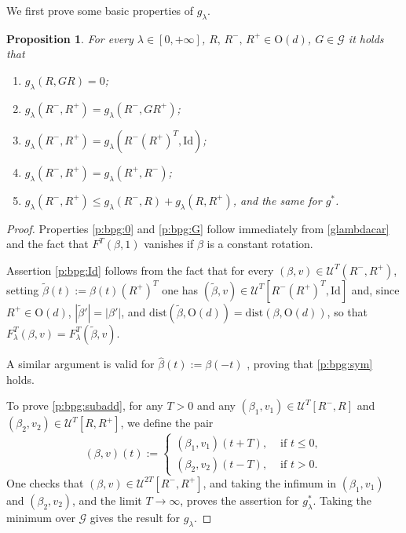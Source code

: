 \documentclass[a4paper,reqno]{amsart}
\newcommand\calU{\mathcal{U}}
\newcommand\dist{{\mathrm{dist}}}
\newcommand\Id{{\mathrm{Id}}}
\newtheorem{proposition}[definition]{Proposition}
\theoremstyle{remark}
\newcommand{\G}{\mathcal{G}}
\newcommand{\On}{\mathrm{O}(d)}
\numberwithin{equation}{section}
\begin{document}
We first prove some basic properties of $g_\lambda$. 
\begin{proposition}\label{p:bpg}
For every $\lambda\in [0,+\infty]$,  $R,\,  R^-,\, R^+ \in \On$, $G\in \G$ it holds that 
\begin{enumerate}
	\item\label{p:bpg:0} $g_\lambda(R, GR)=0$;
	\item\label{p:bpg:G} $g_\lambda( R^-, R^+)=g_\lambda( R^-, GR^+)$;
	\item\label{p:bpg:Id} $g_\lambda( R^-, R^+)=g_\lambda( R^-(R^+)^T, \Id)$;
\item\label{p:bpg:sym} $g_\lambda( R^-, R^+)=g_\lambda(R^+, R^-)$;
\item\label{p:bpg:subadd} $g_\lambda( R^-,R^+)
    \le g_\lambda(R^-, R)+g_\lambda(R,R^+)$, and the same for $g^*$.
\end{enumerate}
\end{proposition}
\begin{proof} 
Properties \ref{p:bpg:0} and \ref{p:bpg:G} follow immediately from
\eqref{glambdacar} and the fact that $F^T(\beta,1)$ vanishes if $\beta$ is a constant rotation.

Assertion \ref{p:bpg:Id} follows from the fact that for every
$(\beta,v)\in \calU^T(R^-,R^+)$, setting
 $\widetilde{\beta}(t):=\beta(t)(R^+)^T$
 one has $(\widetilde\beta,v)\in \calU^T[R^-(R^+)^T,\Id]$
 and, since $R^+\in \On$,
$| \widetilde{\beta}'|=|\beta'|$, and $\dist(\widetilde{\beta}, \On)=\dist(\beta, \On)$, so that
$F^T_\lambda(\beta,v)=F^T_\lambda(\widetilde\beta,v)$.

A similar argument is valid for $\widehat{\beta}(t):={\beta}(-t)$ , proving that \ref{p:bpg:sym} holds.

To prove \ref{p:bpg:subadd}, for any $T>0$ and any $(\beta_1,v_1)\in \calU^T[ R^-,R]$ and
$(\beta_2,v_2)\in \calU^T[ R,R^+]$,
we define the pair
\begin{equation*}
(\beta,v)(t):=
\begin{cases}
 (\beta_1,v_1)(t+T), & \text{ if } t\le 0,\\
 (\beta_2,v_2)(t-T), & \text{ if } t> 0.
\end{cases}
\end{equation*}
One checks that
$(\beta,v)\in \calU^{2T}[ R^-,R^+]$, and taking the infimum in $(\beta_1,v_1)$ and $(\beta_2,v_2)$, and the limit $T\to\infty$, proves the assertion for $g_\lambda^*$. Taking the minimum over $\G$ gives the result for $g_\lambda$.
\end{proof}
\end{document}
